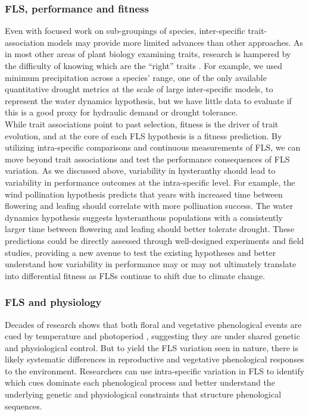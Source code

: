 \documentclass{article}
\begin{document}
\subsubsection*{FLS, performance and fitness}
Even with focused work on sub-groupings of species, inter-specific trait-association models may provide more limited advances than other approaches. As in most other areas of plant biology examining traits, research is hampered by the difficulty of knowing which are the ``right'' traits \citep{Violle2007}. For example, we used minimum precipitation across a species' range, one of the only available quantitative drought metrics at the scale of large inter-specific models, to represent the water dynamics hypothesis, but we have little data to evaluate if this is a good proxy for hydraulic demand or drought tolerance. \\

\noindent While trait associations point to past selection, fitness is the driver of trait evolution, and at the core of each FLS hypothesis is a fitness prediction. By utilizing intra-specific comparisons and continuous measurements of FLS, we can move beyond trait associations and test the performance consequences of FLS variation. As we discussed above, variability in hysteranthy should lead to variability in performance outcomes at the intra-specific level. For example, the wind pollination hypothesis predicts that years with increased time between flowering and leafing should correlate with more pollination success. The water dynamics hypothesis suggests hysteranthous populations with a consistently larger time between flowering and leafing should better tolerate drought. These predictions could be directly assessed through well-designed experiments and field studies, providing a new avenue to test the existing hypotheses and better understand how variability in performance may or may not ultimately translate into differential fitness as FLSs continue to shift due to climate change.\\

\subsubsection*{FLS and physiology} 
\noindent Decades of research shows that both floral and vegetative phenological events are cued by temperature and photoperiod \citep{Forrest2010, Flynn2018}, suggesting they are under shared genetic and physiological control. But to yield the FLS variation seen in nature, there is likely systematic differences in reproductive and vegetative phenological responses to the environment. Researchers can use intra-specific variation in FLS to identify which cues dominate each phenological process and better understand the underlying genetic and physiological constraints that structure phenological sequences.\\
\end{document}
